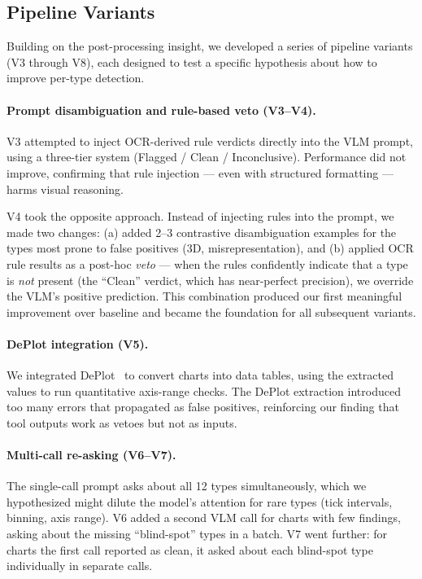 \subsection{Pipeline Variants}
\label{sec:pipeline}

Building on the post-processing insight, we developed a series of pipeline variants (V3 through V8), each designed to test a specific hypothesis about how to improve per-type detection.

\paragraph{Prompt disambiguation and rule-based veto (V3--V4).}
V3 attempted to inject OCR-derived rule verdicts directly into the VLM prompt, using a three-tier system (Flagged / Clean / Inconclusive). Performance did not improve, confirming that rule injection --- even with structured formatting --- harms visual reasoning.

V4 took the opposite approach. Instead of injecting rules into the prompt, we made two changes: (a) added 2--3 contrastive disambiguation examples for the types most prone to false positives (3D, misrepresentation), and (b) applied OCR rule results as a post-hoc \textit{veto} --- when the rules confidently indicate that a type is \textit{not} present (the ``Clean'' verdict, which has near-perfect precision), we override the VLM's positive prediction. This combination produced our first meaningful improvement over baseline and became the foundation for all subsequent variants.

\paragraph{DePlot integration (V5).}
We integrated DePlot~\cite{liu2023deplot} to convert charts into data tables, using the extracted values to run quantitative axis-range checks. The DePlot extraction introduced too many errors that propagated as false positives, reinforcing our finding that tool outputs work as vetoes but not as inputs.

\paragraph{Multi-call re-asking (V6--V7).}
The single-call prompt asks about all 12 types simultaneously, which we hypothesized might dilute the model's attention for rare types (tick intervals, binning, axis range). V6 added a second VLM call for charts with few findings, asking about the missing ``blind-spot'' types in a batch. V7 went further: for charts the first call reported as clean, it asked about each blind-spot type individually in separate calls.

